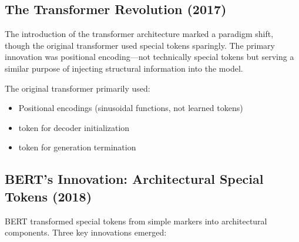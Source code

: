 \subsection{The Transformer Revolution (2017)}

The introduction of the transformer architecture \citep{vaswani2017attention} marked a paradigm shift, though the original transformer used special tokens sparingly. The primary innovation was positional encoding---not technically special tokens but serving a similar purpose of injecting structural information into the model.

\begin{example}
The original transformer primarily used:
\begin{itemize}
\item Positional encodings (sinusoidal functions, not learned tokens)
\item {} token for decoder initialization
\item {} token for generation termination
\end{itemize}
\end{example}

\subsection{BERT's Innovation: Architectural Special Tokens (2018)}

BERT \citep{devlin2018bert} transformed special tokens from simple markers into architectural components. Three key innovations emerged:

